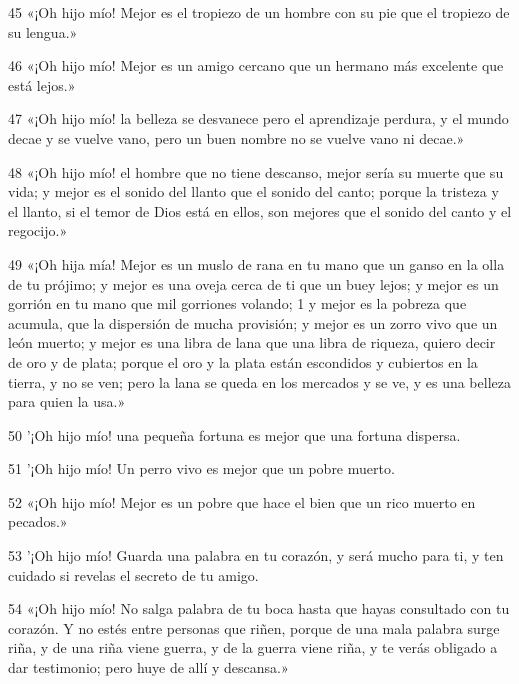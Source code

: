 \par 45 «¡Oh hijo mío! Mejor es el tropiezo de un hombre con su pie que el tropiezo de su lengua.»

\par 46 «¡Oh hijo mío! Mejor es un amigo cercano que un hermano más excelente que está lejos.»

\par 47 «¡Oh hijo mío! la belleza se desvanece pero el aprendizaje perdura, y el mundo decae y se vuelve vano, pero un buen nombre no se vuelve vano ni decae.»

\par 48 «¡Oh hijo mío! el hombre que no tiene descanso, mejor sería su muerte que su vida; y mejor es el sonido del llanto que el sonido del canto; porque la tristeza y el llanto, si el temor de Dios está en ellos, son mejores que el sonido del canto y el regocijo.»

\par 49 «¡Oh hija mía! Mejor es un muslo de rana en tu mano que un ganso en la olla de tu prójimo; y mejor es una oveja cerca de ti que un buey lejos; y mejor es un gorrión en tu mano que mil gorriones volando; 1 y mejor es la pobreza que acumula, que la dispersión de mucha provisión; y mejor es un zorro vivo que un león muerto; y mejor es una libra de lana que una libra de riqueza, quiero decir de oro y de plata; porque el oro y la plata están escondidos y cubiertos en la tierra, y no se ven; pero la lana se queda en los mercados y se ve, y es una belleza para quien la usa.»

\par 50 '¡Oh hijo mío! una pequeña fortuna es mejor que una fortuna dispersa.

\par 51 '¡Oh hijo mío! Un perro vivo es mejor que un pobre muerto.

\par 52 «¡Oh hijo mío! Mejor es un pobre que hace el bien que un rico muerto en pecados.»

\par 53 '¡Oh hijo mío! Guarda una palabra en tu corazón, y será mucho para ti, y ten cuidado si revelas el secreto de tu amigo.

\par 54 «¡Oh hijo mío! No salga palabra de tu boca hasta que hayas consultado con tu corazón. Y no estés entre personas que riñen, porque de una mala palabra surge riña, y de una riña viene guerra, y de la guerra viene riña, y te verás obligado a dar testimonio; pero huye de allí y descansa.»

